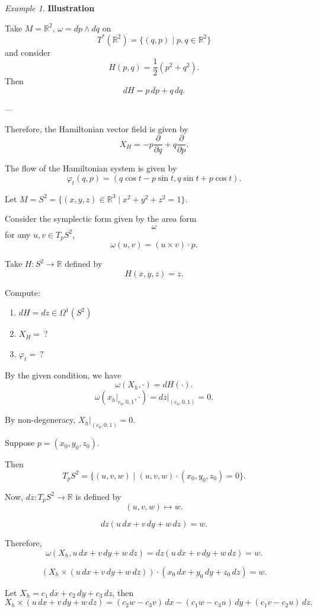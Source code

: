 \documentclass[11pt]{article}
\theoremstyle{definition}
\theoremstyle{remark}
\newtheorem{example}{Example}[section]
\begin{document}
\begin{example}\label{ex:illustration}
\textbf{Illustration}

Take $M = \mathbb{R}^2$, $\omega = dp \wedge dq$ on
\[
T^*(\mathbb{R}^2) = \{(q, p) \mid p, q \in \mathbb{R}^2\}
\]
and consider
\[
H(p, q) = \frac{1}{2}(p^2 + q^2).
\]
Then
\[
dH = p \, dp + q \, dq.
\]
\end{example}

---

Therefore, the Hamiltonian vector field is given by
\[ X_H = -p \frac{\partial}{\partial q} + q \frac{\partial}{\partial p}. \]

The flow of the Hamiltonian system is given by
\[ \varphi_t(q, p) = (q \cos t - p \sin t, q \sin t + p \cos t). \]

Let \( M = S^2 = \{(x, y, z) \in \mathbb{R}^3 \mid x^2 + y^2 + z^2 = 1\} \).

Consider the symplectic form given by the area form
\[ \omega \]
for any \( u, v \in T_p S^2 \),
\[ \omega(u, v) = (u \times v) \cdot p. \]

Take \( H: S^2 \to \mathbb{R} \) defined by
\[ H(x, y, z) = z. \]

Compute:
\begin{enumerate}
    \item \( dH = dz \in \Omega^1(S^2) \)
    \item \( X_H = \ ? \)
    \item \( \varphi_t = \ ? \)
\end{enumerate}

By the given condition, we have
\[
\omega(X_h, \cdot) = dH(\cdot).
\]
\[
\omega(x_h|_{c_0, 0, 1}, \cdot) = dz \Big|_{(c_0, 0, 1)} = 0.
\]

By non-degeneracy, \(X_h |_{(c_0, 0, 1)} = 0\).

Suppose \(p = (x_0, y_0, z_0)\).

Then
\[
T_p S^2 = \{(u, v, w) \mid (u, v, w) \cdot (x_0, y_0, z_0) = 0\}.
\]

Now, \(dz : T_p S^2 \to \mathbb{R}\) is defined by
\[
(u, v, w) \mapsto w.
\]

\[
dz(u \, dx + v \, dy + w \, dz) = w.
\]

Therefore,
\[
\omega(X_h, u \, dx + v \, dy + w \, dz) = dz(u \, dx + v \, dy + w \, dz) = w.
\]

\[
(X_h \times (u \, dx + v \, dy + w \, dz)) \cdot (x_0 \, dx + y_0 \, dy + z_0 \, dz) = w.
\]

Let \(X_h = c_1 \, dx + c_2 \, dy + c_3 \, dz\), then
\[
X_h \times (u \, dx + v \, dy + w \, dz) = (c_2 w - c_3 v) \, dx - (c_1 w - c_3 u) \, dy + (c_1 v - c_2 u) \, dz.
\]
\end{document}
